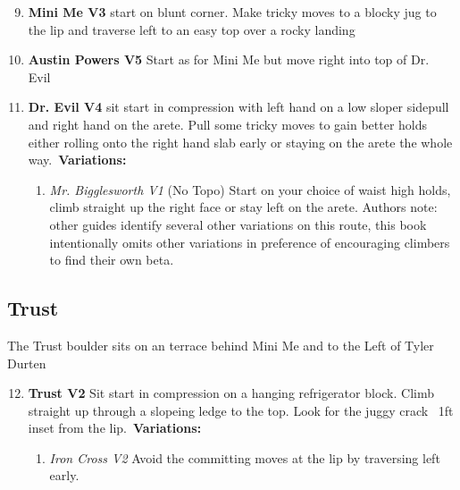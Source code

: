 \begin{enumerate}[]
	\setcounter{enumi}{8}
	\item\label{rt:Mini Me} \colorbox{green!20}{\textbf{Mini Me V3  } }
	\newline start on blunt corner. Make tricky moves to a blocky jug to the lip and traverse left to an easy top over a rocky landing\
	\setcounter{enumi}{9}
	\item\label{rt:Austin Powers} \colorbox{RoyalBlue!20}{\textbf{Austin Powers V5    } }
	\newline Start as for Mini Me but move right into top of Dr. Evil\
	\setcounter{enumi}{10}
	\item\label{rt:Dr. Evil} \colorbox{RoyalBlue!20}{\textbf{Dr. Evil V4    } }
	\newline sit start in compression with left hand on a low sloper sidepull and right hand on the arete. Pull some tricky moves to gain better holds either rolling onto the right hand slab early or staying on the arete the whole way.\
	\newline \textbf{Variations:}
	\begin{enumerate}
		\item\label{vr:Mr. Bigglesworth} \colorbox{green!20}{\emph{Mr. Bigglesworth V1 \ding{72} \ding{72}  }  }
		\newline (No Topo) 
		\newline Start on your choice of waist high holds, climb straight up the right face or stay left on the arete. Authors note: other guides identify several other variations on this route, this book intentionally omits other variations in preference of encouraging climbers to find their own beta.\
	\end{enumerate}
\end{enumerate}
\subsection*{Trust}\label{bf:Trust}
The Trust boulder sits on an terrace behind Mini Me and to the Left of Tyler Durten

\begin{enumerate}[]
	\setcounter{enumi}{11}
	\item\label{rt:Trust} \colorbox{green!20}{\textbf{Trust V2  \ding{72} \ding{72}  } }
	\newline Sit start in compression on a hanging refrigerator block. Climb straight up through a slopeing ledge to the top. Look for the juggy crack ~1ft inset from the lip.\
	\newline \textbf{Variations:}
	\begin{enumerate}
		\item\label{vr:Iron Cross} \colorbox{green!20}{\emph{Iron Cross V2   }  }
		\newline Avoid the committing moves at the lip by traversing left early.\
	\end{enumerate}
\end{enumerate}
